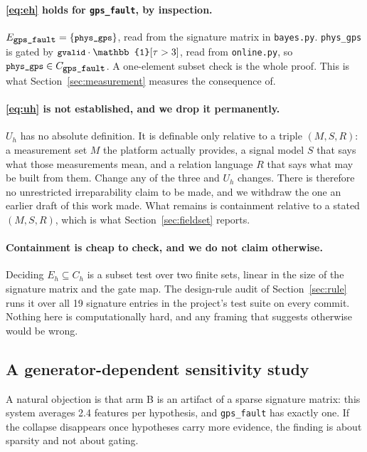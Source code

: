 \documentclass[11pt,a4paper]{article}
\newcommand{\code}[1]{\texttt{\small #1}}
\begin{document}
\paragraph{\eqref{eq:eh} holds for \code{gps\_fault}, by inspection.}
$E_{\code{gps\_fault}} = \{\code{phys\_gps}\}$, read from the signature matrix
in \code{bayes.py}. \code{phys\_gps} is gated by
$\code{gvalid} \cdot \mathbb{1}[\tau > 3]$, read from \code{online.py}, so
$\code{phys\_gps} \in C_{\code{gps\_fault}}$. A one-element subset check is the
whole proof. This is what Section~\ref{sec:measurement} measures the
consequence of.

\paragraph{\eqref{eq:uh} is not established, and we drop it permanently.}
$U_h$ has no absolute definition. It is definable only relative to a triple
$(M, S, R)$: a measurement set $M$ the platform actually provides, a signal
model $S$ that says what those measurements mean, and a relation language $R$
that says what may be built from them. Change any of the three and $U_h$
changes. There is therefore no unrestricted irreparability claim to be made,
and we withdraw the one an earlier draft of this work made. What remains is
containment relative to a stated $(M, S, R)$, which is what
Section~\ref{sec:fieldset} reports.

\paragraph{Containment is cheap to check, and we do not claim otherwise.}
Deciding $E_h \subseteq C_h$ is a subset test over two finite sets, linear in
the size of the signature matrix and the gate map. The design-rule audit of
Section~\ref{sec:rule} runs it over all 19 signature entries in the project's
test suite on every commit. Nothing here is computationally hard, and any
framing that suggests otherwise would be wrong.

\subsection{A generator-dependent sensitivity study}

A natural objection is that arm B is an artifact of a sparse signature matrix:
this system averages 2.4 features per hypothesis, and \code{gps\_fault} has
exactly one. If the collapse disappears once hypotheses carry more evidence,
the finding is about sparsity and not about gating.
\end{document}
